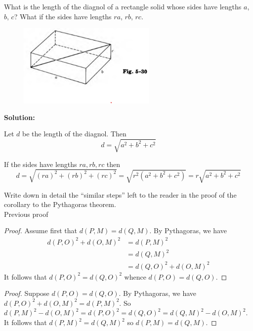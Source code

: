 \begin{tcolorbox}[title=Problem 5, breakable]
    What is the length of the diagnol of a rectangle solid whose sides have 
    lengths $a$, $b$, $c$? What if the sides have lengths $ra$, $rb$, $rc$.
\end{tcolorbox}

\begin{figure}[h]
    \centering
    \includegraphics[width=0.6\textwidth]{images/5_3.png}
\end{figure}

\textbf{Solution:}

Let $d$ be the length of the diagnol. Then
\[d = \sqrt{a^2 + b^2 + c^2}\]

If the sides have lengths $ra, rb, rc$ then
\[d = \sqrt{(ra)^2 + (rb)^2 + (rc)^2} = \sqrt{r^2(a^2 + b^2 + c^2)} = r\sqrt{a^2 + b^2 + c^2}\]

\begin{tcolorbox}[title=Problem 9, breakable]
    Write down in detail the ``similar steps'' left to the reader 
    in the proof of the corollary to the Pythagoras theorem. \\

    Previous proof
    \begin{proof}
        Assume first that $d(P, M) = d(Q, M)$. By Pythagoras, we have 
        \begin{align*}
            d(P, O)^2 + d(O, M)^2 
            &= d(P, M)^2 \\
            &= d(Q, M)^2 \\
            &= d(Q, O)^2 + d(O, M)^2
        \end{align*}
        It follows that $d(P, O)^2 = d(Q, O)^2$
        whence $d(P, O) = d(Q, O)$.
    \end{proof}
\end{tcolorbox}

\begin{proof}
    Suppose $d(P, O) = d(Q, O)$.
    By Pythagoras, we have $d(P, O)^2 + d(O, M)^2 = d(P, M)^2$.
    So $d(P, M)^2 - d(O, M)^2 = d(P, O)^2 = d(Q, O)^2 = d(Q, M)^2 - d(O, M)^2$.
    It follows that $d(P, M)^2 = d(Q, M)^2$ so $d(P, M) = d(Q, M)$.
\end{proof}

